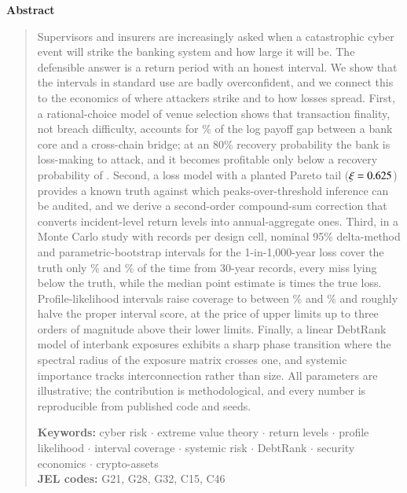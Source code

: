 \documentclass[11pt]{article}
\theoremstyle{plain}
\theoremstyle{definition}
\theoremstyle{remark}
\begin{document}
\vspace{2pt}
\begin{center}{\bfseries Abstract}\end{center}
\vspace{-5pt}
\begin{quote}\small
Supervisors and insurers are increasingly asked when a catastrophic cyber event will strike the banking system and how large it will be. The defensible answer is a return period with an honest interval. We show that the intervals in standard use are badly overconfident, and we connect this to the economics of where attackers strike and to how losses spread. First, a rational-choice model of venue selection shows that transaction finality, not breach difficulty, accounts for \shareFinality\% of the log payoff gap between a bank core and a cross-chain bridge; at an 80\% recovery probability the bank is loss-making to attack, and it becomes profitable only below a recovery probability of \breakEven. Second, a loss model with a planted Pareto tail ($\xi = 0.625$) provides a known truth against which peaks-over-threshold inference can be audited, and we derive a second-order compound-sum correction that converts incident-level return levels into annual-aggregate ones. Third, in a Monte Carlo study with \Reps{} records per design cell, nominal 95\% delta-method and parametric-bootstrap intervals for the 1-in-1,000-year loss cover the truth only \covBThirtyDeltaK\% and \covBThirtyBootstrapK\% of the time from 30-year records, every miss lying below the truth, while the median point estimate is \medRatioBThirtyK{} times the true loss. Profile-likelihood intervals raise coverage to between \covBThirtyProfileK\% and \covAThreeHundredProfileK\% and roughly halve the proper interval score, at the price of upper limits up to three orders of magnitude above their lower limits. Finally, a linear DebtRank model of interbank exposures exhibits a sharp phase transition where the spectral radius of the exposure matrix crosses one, and systemic importance tracks interconnection rather than size. All parameters are illustrative; the contribution is methodological, and every number is reproducible from published code and seeds.

\vspace{5pt}
\noindent\textbf{Keywords:} cyber risk $\cdot$ extreme value theory $\cdot$ return levels $\cdot$ profile likelihood $\cdot$ interval coverage $\cdot$ systemic risk $\cdot$ DebtRank $\cdot$ security economics $\cdot$ crypto-assets\\[2pt]
\noindent\textbf{JEL codes:} G21, G28, G32, C15, C46
\end{quote}
\vspace{2pt}
\end{document}
